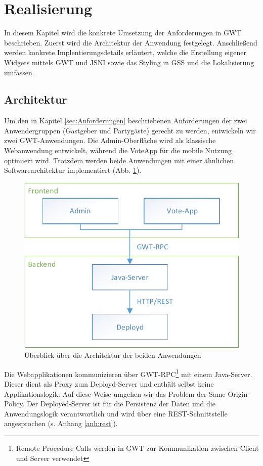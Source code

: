 \section{Realisierung}

In diesem Kapitel wird die konkrete Umsetzung der Anforderungen in GWT beschrieben.
Zuerst wird die Architektur der Anwendung festgelegt. Anschließend werden konkrete
Implentierungsdetails erläutert, welche die Erstellung eigener Widgets mittels GWT und
JSNI sowie das Styling in GSS und die Lokalisierung umfassen.

\subsection{Architektur}
Um den in Kapitel \ref{sec:Anforderungen} beschriebenen Anforderungen der zwei Anwendergruppen (Gastgeber und Partygäste) gerecht zu werden, entwickeln wir zwei GWT-Anwendungen. Die Admin-Oberfläche wird als klassische Webanwendung
entwickelt, während die VoteApp für die mobile Nutzung optimiert wird. Trotzdem werden beide Anwendungen mit einer ähnlichen Softwarearchitektur implementiert (Abb. \ref{fig:Architektur-Ueberblick}).

\begin{figure}[tbh]
\centering
\includegraphics[width=0.7\linewidth]{Bilder/Architektur-Ueberblick}
\caption{Überblick über die Architektur der beiden Anwendungen}
\label{fig:Architektur-Ueberblick}
\end{figure}

Die Webapplikationen kommunizieren über GWT-RPC\footnote{Remote Procedure Calls werden in GWT zur Kommunikation zwischen Client und Server verwendet} mit einem Java-Server. Dieser dient als 
Proxy zum Deployd-Server und enthält selbst keine Applikationslogik. Auf diese Weise umgehen wir das Problem der Same-Origin-Policy. Der Deployed-Server ist für die Persistenz der Daten und die Anwendungslogik verantwortlich und wird über eine REST-Schnittstelle angesprochen (s. Anhang \ref{anh:rest}).

